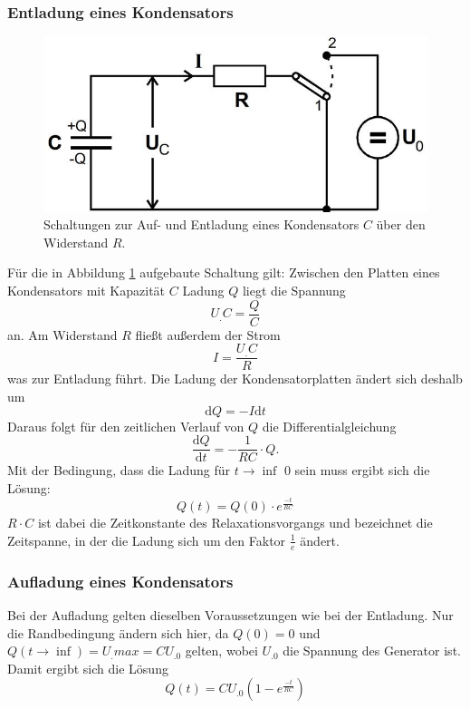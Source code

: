 \subsubsection{Entladung eines Kondensators}
\label{sec:Entladung}
\begin{figure}
\centering
\includegraphics[scale=0.35]{content/images/theorie.jpg}
\caption{Schaltungen zur Auf- und Entladung eines Kondensators $C$ über den Widerstand $R$.\cite{V353}}
\label{fig:theorie}
\end{figure}
Für die in Abbildung \ref{fig:theorie} aufgebaute Schaltung gilt:
Zwischen den Platten eines Kondensators mit Kapazität $C$ Ladung $Q$  liegt die Spannung
\begin{equation}
U_.C=\frac{Q}{C}\label{eq:QC}
\end{equation}
an. Am Widerstand $R$ fließt außerdem der Strom
\begin{equation}
I = \frac{U_.C}{R}
\end{equation}
was zur Entladung führt.
Die Ladung der Kondensatorplatten ändert sich deshalb um
\begin{equation}
\mathrm{d}Q = - I\mathrm{d}t\label{eq:dQ}
\end{equation}
Daraus folgt für den zeitlichen Verlauf von $Q$ die Differentialgleichung
\begin{equation}
\frac{\mathrm{d}Q}{\mathrm{d}t} = - \frac{1}{RC}\cdot Q\text{.}
\label{eq:DGL}
\end{equation}
Mit der Bedingung, dass die Ladung für $t\rightarrow\inf$ 0 sein muss ergibt sich die Lösung:
\begin{equation}
Q(t) = Q(0)\cdot e^{\frac{-t}{RC}} \label{eq:Q1}
\end{equation}
$R\cdot C$ ist dabei die Zeitkonstante des Relaxationsvorgangs und bezeichnet die Zeitspanne, in der die Ladung sich um den Faktor $\frac{1}{e}$ ändert.
\subsubsection{Aufladung eines Kondensators}
\label{sec:Aufladung}
Bei der Aufladung gelten dieselben Voraussetzungen wie bei der Entladung. Nur die Randbedingung ändern sich hier, da $Q(0)=0$ und $Q(t\rightarrow\inf)=U_.{max}=CU_.0$ gelten, wobei $U_.0$ die Spannung des Generator ist.
Damit ergibt sich die Lösung
\begin{equation}
Q(t) = CU_.0\left(1-e^{\frac{-t}{RC}}\right) \label{eq:Q2}
\end{equation}
